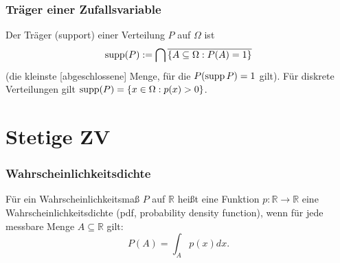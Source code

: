\begin{frame}
  \frametitle{Träger einer Zufallsvariable}
  \vspace{-0.5cm}
  \begin{definition}
    Der \alert{Träger} (support) einer Verteilung $P$ auf $\Omega$ ist
    \[\operatorname{supp}(P) := \bigcap \overline{\{ A \subseteq \Omega : P(A) = 1 \}}\]
    (die kleinste [abgeschlossene] Menge, für die $P(\operatorname{supp} P) = 1$ gilt). Für diskrete Verteilungen gilt $\operatorname{supp}(P) = \{x\in\Omega: p(x) > 0\}$.
  \end{definition}
  \medskip
  
\smallskip

\end{frame}

\section{Stetige ZV}

\begin{frame}
  \frametitle{Wahrscheinlichkeitsdichte}
  \begin{definition}
    Für ein Wahrscheinlichkeitsmaß $P$ auf $\mathbb{R}$
    heißt eine Funktion $p \colon \mathbb{R} \to \mathbb{R}$
    eine \alert{Wahrscheinlichkeitsdichte} (\alert{pdf, probability density function}),
    wenn für jede messbare Menge $A \subseteq \mathbb{R}$ gilt:
    \[P(A) = \int_A p(x) dx.\]
  \end{definition}
\medskip
\end{frame}

